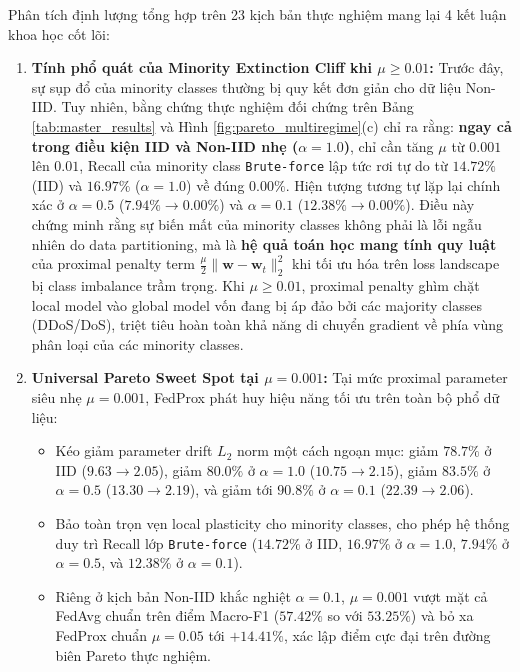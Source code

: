 Phân tích định lượng tổng hợp trên 23 kịch bản thực nghiệm mang lại 4 kết luận khoa học cốt lõi:
\begin{enumerate}
    \item \textbf{Tính phổ quát của Minority Extinction Cliff khi $\mu \ge 0.01$:}
    Trước đây, sự sụp đổ của minority classes thường bị quy kết đơn giản cho dữ liệu Non-IID. Tuy nhiên, bằng chứng thực nghiệm đối chứng trên Bảng \ref{tab:master_results} và Hình \ref{fig:pareto_multiregime}(c) chỉ ra rằng: \textbf{ngay cả trong điều kiện IID và Non-IID nhẹ ($\alpha=1.0$)}, chỉ cần tăng $\mu$ từ $0.001$ lên $0.01$, Recall của minority class \texttt{Brute-force} lập tức rơi tự do từ $14.72\%$ (IID) và $16.97\%$ ($\alpha=1.0$) về đúng $\mathbf{0.00\%}$. Hiện tượng tương tự lặp lại chính xác ở $\alpha=0.5$ ($7.94\% \to 0.00\%$) và $\alpha=0.1$ ($12.38\% \to 0.00\%$). Điều này chứng minh rằng sự biến mất của minority classes không phải là lỗi ngẫu nhiên do data partitioning, mà là \textbf{hệ quả toán học mang tính quy luật} của proximal penalty term $\frac{\mu}{2}\|\mathbf{w} - \mathbf{w}_t\|_2^2$ khi tối ưu hóa trên loss landscape bị class imbalance trầm trọng. Khi $\mu \ge 0.01$, proximal penalty ghìm chặt local model vào global model vốn đang bị áp đảo bởi các majority classes (DDoS/DoS), triệt tiêu hoàn toàn khả năng di chuyển gradient về phía vùng phân loại của các minority classes.

    \item \textbf{Universal Pareto Sweet Spot tại $\mu = 0.001$:}
    Tại mức proximal parameter siêu nhẹ $\mu = 0.001$, FedProx phát huy hiệu năng tối ưu trên toàn bộ phổ dữ liệu:
    \begin{itemize}
        \item Kéo giảm parameter drift $L_2$ norm một cách ngoạn mục: giảm $78.7\%$ ở IID ($9.63 \to 2.05$), giảm $80.0\%$ ở $\alpha=1.0$ ($10.75 \to 2.15$), giảm $83.5\%$ ở $\alpha=0.5$ ($13.30 \to 2.19$), và giảm tới $\mathbf{90.8\%}$ ở $\alpha=0.1$ ($22.39 \to 2.06$).
        \item Bảo toàn trọn vẹn local plasticity cho minority classes, cho phép hệ thống duy trì Recall lớp \texttt{Brute-force} ($14.72\%$ ở IID, $16.97\%$ ở $\alpha=1.0$, $7.94\%$ ở $\alpha=0.5$, và $12.38\%$ ở $\alpha=0.1$).
        \item Riêng ở kịch bản Non-IID khắc nghiệt $\alpha=0.1$, $\mu=0.001$ vượt mặt cả FedAvg chuẩn trên điểm Macro-F1 ($\mathbf{57.42\%}$ so với $53.25\%$) và bỏ xa FedProx chuẩn $\mu=0.05$ tới $\mathbf{+14.41\%}$, xác lập điểm cực đại trên đường biên Pareto thực nghiệm.
    \end{itemize}


\end{enumerate}
